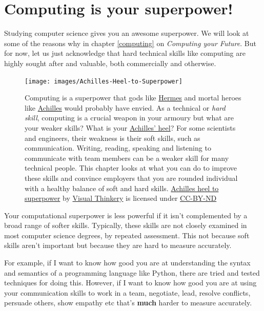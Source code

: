 \documentclass[
]{book}
\begin{document}
\hypertarget{superpower}{%
\section{Computing is your superpower!}\label{superpower}}

Studying computer science gives you an awesome superpower. We will look at some of the reasons why in chapter \ref{computing} on \emph{Computing your Future}. But for now, let us just acknowledge that hard technical skills like computing are highly sought after and valuable, both commercially and otherwise.

\begin{figure}

{\centering \texttt{[image: images/Achilles-Heel-to-Superpower]} 

}

\caption{Computing is a superpower that gods like \href{https://en.wikipedia.org/wiki/Hermes}{Hermes} and mortal heroes like \href{https://en.wikipedia.org/wiki/Achilles}{Achilles} would probably have envied. \citep{heroes} As a technical or \emph{hard skill}, computing is a crucial weapon in your armoury but what are your weaker skills? What is your \href{https://en.wikipedia.org/wiki/Achilles\%27_heel}{Achilles' heel}? For some scientists and engineers, their weakness is their soft skills, such as communication. Writing, reading, speaking and listening to communicate with team members can be a weaker skill for many technical people. This chapter looks at what you can do to improve these skills and convince employers that you are rounded individual with a healthy balance of soft and hard skills. \href{https://bryanmmathers.com/achilles-heel-to-superpower/}{Achilles heel to superpower} by \href{https://visualthinkery.com}{Visual Thinkery} is licensed under \href{https://creativecommons.org/licenses/by-nd/4.0/}{CC-BY-ND}}\label{fig:achilles-fig}
\end{figure}



Your computational superpower is less powerful if it isn't complemented by a broad range of softer skills. Typically, these skills are not closely examined in most computer science degrees, by repeated assessment. This not because soft skills aren't important but because they are hard to measure accurately.

For example, if I want to know how good you are at understanding the syntax and semantics of a programming language like Python, there are tried and tested techniques for doing this. However, if I want to know how good you are at using your communication skills to work in a team, negotiate, lead, resolve conflicts, persuade others, show empathy etc that's \textbf{much} harder to measure accurately.
\end{document}
